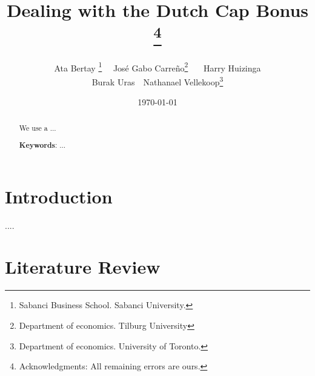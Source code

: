 \documentclass[12pt]{article}
\title{Dealing with the Dutch Cap Bonus \thanks{Acknowledgments: All remaining errors are ours.}}
\author{Ata Bertay \thanks{%
		Sabanci Business School. Sabanci University.}   \ \   José Gabo Carreño\thanks{%
		Department of economics. Tilburg University} \ \ \ Harry Huizinga\footnotemark[3] \\  Burak Uras\footnotemark[3] \ \ Nathanael Vellekoop\thanks{Department of economics. University of Toronto.} }
\date{\today}
\begin{document}
\maketitle

\begin{abstract}

We use a ...

\textbf{Keywords}: ...

\end{abstract}
\vspace{1cm}


\newpage

\section{Introduction}
....




\newpage
\section{Literature Review} \label{literature_review}
\end{document}
